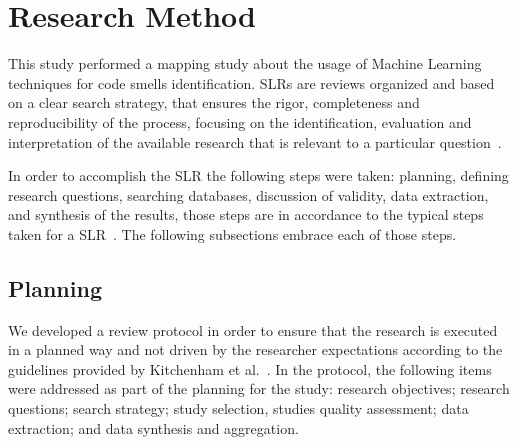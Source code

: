 \section{Research Method}


This study performed a mapping study about the usage of Machine Learning techniques for code smells identification. SLRs are reviews organized and based on a clear search strategy, that ensures the rigor, completeness and reproducibility of the process, focusing on the identification, evaluation and interpretation of the available research that is relevant to a particular question~\citep{kitchenham2010systematic}.

In order to accomplish the SLR the following steps were taken: planning, defining research questions, searching databases, discussion of validity, data extraction, and synthesis of the results, those steps are in accordance to the typical steps taken for a SLR~\citep{keele2007guidelines}. The following subsections embrace each of those steps.

\subsection{Planning}

We developed a review protocol in order to ensure that the research is executed in a planned way and not driven by the researcher expectations according to the guidelines provided by Kitchenham et al.~\cite{kitchenham2015evidence}. In the protocol, the following items were addressed as part of the planning for the study: research objectives; research questions; search strategy; study selection, studies quality assessment; data extraction; and data synthesis and aggregation.

